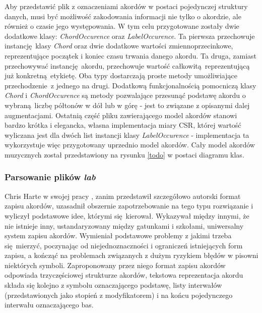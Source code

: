 Aby przedstawić plik z oznaczeniami akordów w postaci pojedynczej struktury danych, musi być
możliwość zakodowania informacji nie tylko o akordzie, ale również o czasie jego występowania. W tym
celu przygotowane zostały dwie dodatkowe klasy: \emph{ChordOccurence} oraz \emph{LabelOccurence}. Ta
pierwsza przechowuje instancję klasy \emph{Chord} oraz dwie dodatkowe wartości zmiennoprzecinkowe,
reprezentujące początek i koniec czasu trwania danego akordu. Ta druga, zamiast przechowywać
instancję akordu, przechowuje wartość całkowitą reprezentującą już konkretną etykietę. Oba typy
dostarczają proste metody umożliwiające przechodzenie z jednego na drugi. Dodatkową funkcjonalnością
pomocniczą klasy \emph{Chord} i \emph{ChordOccurence} są metody pozwalające przesunąć podstawę
akordu o wybraną liczbę półtonów w dół lub w górę - jest to związane z opisanymi dalej
augmentacjami. Ostatnią część pliku zawierającego model akordów stanowi bardzo krótka i elegancka,
własna implementacja miary CSR, której wartość wyliczana jest dla dwóch list instancji klasy
\emph{LabelOccurence} - implementacja ta wykorzystuje więc przygotowany uprzednio model akordów.
Cały model akordów muzycznych został przedstawiony na rysunku \ref{todo} w postaci diagramu klas.

\subsubsection{Parsowanie plików \emph{lab}}

Chris Harte w swojej pracy \cite{harte_towards_nodate}, zanim przedstawił szczegółowo autorski
format zapisu akordów, uzasadnił obszernie zapotrzebowanie na tego typu rozwiązanie i wyliczył
podstawowe idee, którymi się kierował. Wykazywał między innymi, że nie istnieje inny,
ustandaryzowany między gatunkami i szkołami, uniwersalny system zapisu akordów.  Wymieniał
podstawowe problemy z jakimi trzeba się mierzyć, poczynając od niejednoznaczności i ograniczeń
istniejących form zapisu, a kończąć na problemach związanych z dużym ryzykiem błędów w pisowni
niektórych symboli. Zaproponowany przez niego format zapisu akordów odpowiada trzyczęściowej
strukturze akordów, tekstowa reprezentacja akordu składa się kolejno z symbolu oznaczającego
podstawę, listy interwałów (przedstawionych jako stopień z modyfikatorem) i na końcu pojedynczego
interwału oznaczającego bas. 


